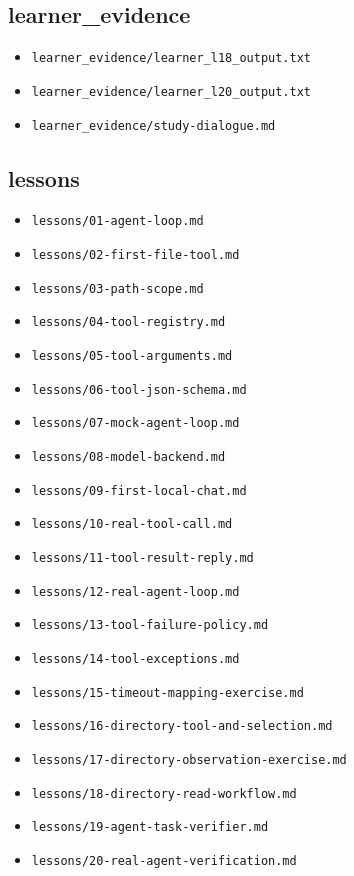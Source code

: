\documentclass[UTF8,zihao=-4,fontset=fandol]{ctexart}
\begin{document}
\subsection{learner\_evidence}
\begin{itemize}
\item \nolinkurl{learner_evidence/learner_l18_output.txt}
\item \nolinkurl{learner_evidence/learner_l20_output.txt}
\item \nolinkurl{learner_evidence/study-dialogue.md}
\end{itemize}

\subsection{lessons}
\begin{itemize}
\item \nolinkurl{lessons/01-agent-loop.md}
\item \nolinkurl{lessons/02-first-file-tool.md}
\item \nolinkurl{lessons/03-path-scope.md}
\item \nolinkurl{lessons/04-tool-registry.md}
\item \nolinkurl{lessons/05-tool-arguments.md}
\item \nolinkurl{lessons/06-tool-json-schema.md}
\item \nolinkurl{lessons/07-mock-agent-loop.md}
\item \nolinkurl{lessons/08-model-backend.md}
\item \nolinkurl{lessons/09-first-local-chat.md}
\item \nolinkurl{lessons/10-real-tool-call.md}
\item \nolinkurl{lessons/11-tool-result-reply.md}
\item \nolinkurl{lessons/12-real-agent-loop.md}
\item \nolinkurl{lessons/13-tool-failure-policy.md}
\item \nolinkurl{lessons/14-tool-exceptions.md}
\item \nolinkurl{lessons/15-timeout-mapping-exercise.md}
\item \nolinkurl{lessons/16-directory-tool-and-selection.md}
\item \nolinkurl{lessons/17-directory-observation-exercise.md}
\item \nolinkurl{lessons/18-directory-read-workflow.md}
\item \nolinkurl{lessons/19-agent-task-verifier.md}
\item \nolinkurl{lessons/20-real-agent-verification.md}

\end{itemize}
\end{document}
